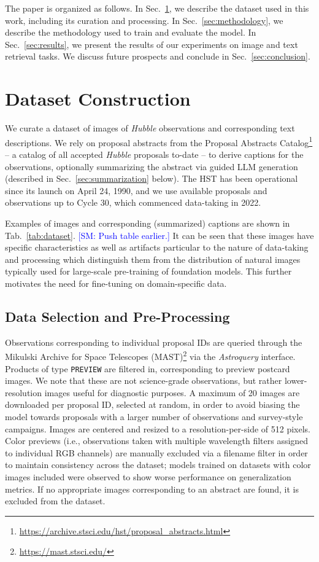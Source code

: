 \documentclass[10pt]{article} %
\newcommand{\package}[1]{\textsl{#1}\xspace}
\newcommand{\SM}[1]{\textcolor{blue}{[SM: #1]}}
\newcommand{\hubble}{\emph{Hubble}\xspace}
\begin{document}
The paper is organized as follows.
%
In Sec.~\ref{sec:dataset}, we describe the dataset used in this work, including its curation and processing.
%
In Sec.~\ref{sec:methodology}, we describe the methodology used to train and evaluate the model.
%
In Sec.~\ref{sec:results}, we present the results of our experiments on image and text retrieval tasks.
%
We discuss future prospects and conclude in Sec.~\ref{sec:conclusion}.

\section{Dataset Construction}
\label{sec:dataset}

We curate a dataset of images of \hubble observations and corresponding text descriptions.
%
We rely on proposal abstracts from the Proposal Abstracts Catalog\footnote{\url{https://archive.stsci.edu/hst/proposal_abstracts.html}} -- a catalog of all accepted \hubble proposals to-date -- to derive captions for the observations, optionally summarizing the abstract via guided LLM generation (described in Sec.~\ref{sec:summarization} below).
%
The HST has been operational since its launch on April 24, 1990, and we use available proposals and observations up to Cycle 30, which commenced data-taking in 2022.
%


Examples of images and corresponding (summarized) captions are shown in Tab.~\ref{tab:dataset}. \SM{Push table earlier.}
%
It can be seen that these images have specific characteristics as well as artifacts particular to the nature of data-taking and processing which distinguish them from the distribution of natural images typically used for large-scale pre-training of foundation models.
%
This further motivates the need for fine-tuning on domain-specific data.

\subsection{Data Selection and Pre-Processing}

Observations corresponding to individual proposal IDs are queried through the Mikulski Archive for Space Telescopes (MAST)\footnote{\url{https://mast.stsci.edu/}} via the \package{Astroquery} \citep{2019AJ....157...98G} interface.
%
Products of type \texttt{PREVIEW} are filtered in, corresponding to preview postcard images.
%
We note that these are not science-grade observations, but rather lower-resolution images useful for diagnostic purposes.
%
A maximum of 20 images are downloaded per proposal ID, selected at random, in order to avoid biasing the model towards proposals with a larger number of observations and survey-style campaigns.
%
Images are centered and resized to a resolution-per-side of 512 pixels.
%
Color previews (i.e., observations taken with multiple wavelength filters assigned to individual RGB channels) are manually excluded via a filename filter in order to maintain consistency across the dataset; models trained on datasets with color images included were observed to show worse performance on generalization metrics.
%
If no appropriate images corresponding to an abstract are found, it is excluded from the dataset.
\end{document}
